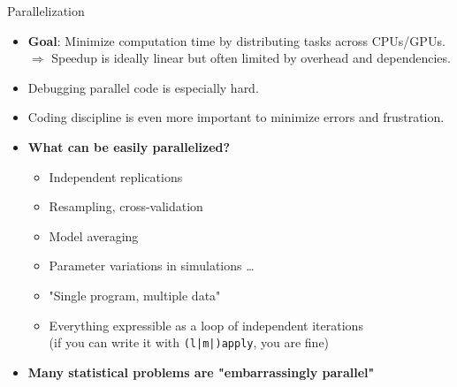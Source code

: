 \documentclass[10pt,compress,t,notes=noshow, xcolor=table]{beamer}
\begin{document}
\begin{frame}[fragile]{Parallelization}
  \begin{itemize}
    \item \textbf{Goal}: Minimize computation time by distributing tasks across CPUs/GPUs.\\
   $\Rightarrow$ Speedup is ideally linear but often limited by overhead and dependencies.%
    \item Debugging parallel code is especially hard.
    \item Coding discipline is even more important to minimize errors and frustration.

  \item \textbf{What can be easily parallelized?}
  \begin{itemize}
    \item Independent replications
    \item Resampling, cross-validation
    \item Model averaging
    \item Parameter variations in simulations \ldots
    \item "Single program, multiple data"
    \item Everything expressible as a loop of independent iterations\\
    (if you can write it with \texttt{(l|m|)apply}, you are fine)
  \end{itemize}
  \item \textbf{Many statistical problems are "embarrassingly parallel"}
  
  \end{itemize}
\end{frame}
\end{document}
